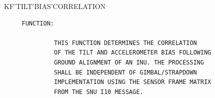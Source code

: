 \begin{frame}
KF'TILT'BIAS'CORRELATION
\begin{verbatim}
     FUNCTION:

              THIS FUNCTION DETERMINES THE CORRELATION
              OF THE TILT AND ACCELEROMETER BIAS FOLLOWING
              GROUND ALIGNMENT OF AN INU. THE PROCESSING
              SHALL BE INDEPENDENT OF GIMBAL/STRAPDOWN
              IMPLEMENTATION USING THE SENSOR FRAME MATRIX
              FROM THE SNU I10 MESSAGE.

\end{verbatim}
\end{frame}
